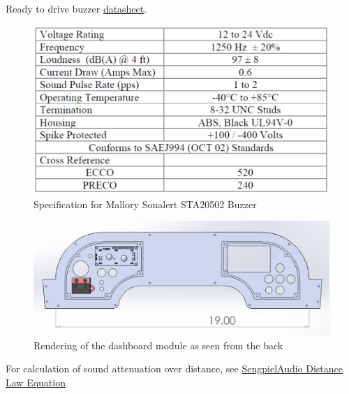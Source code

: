 \documentclass{article}
\begin{document}
Ready to drive buzzer \href{http://www.mallory-sonalert.com/specifications/STA20502.PDF}{datasheet}. \newline
\begin{figure}[H]
	\includegraphics[width=\linewidth]{Buzzer_Specifications}
	\caption{Specification for Mallory Sonalert STA20502 Buzzer}
\end{figure}

\begin{figure}[H]
	\includegraphics[width=\linewidth]{Dashboard_Rendering_Rear}
	\caption{Rendering of the dashboard module as seen from the back} \label{fig:Dashboard Render}
\end{figure}

For calculation of sound attenuation over distance, see \href{http://www.sengpielaudio.com/calculator-distance.htm}{SengpielAudio Distance Law Equation}
\end{document}
